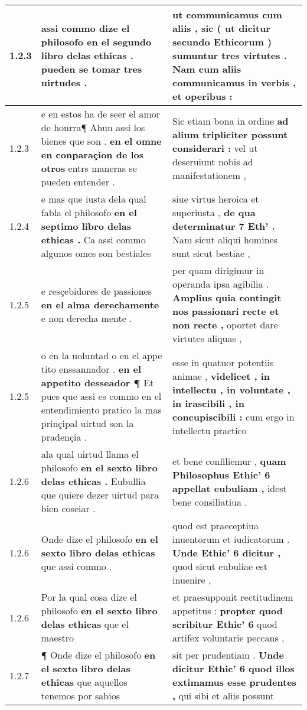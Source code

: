 \begin{tabular}{|p{1cm}|p{6.5cm}|p{6.5cm}|}
1.2.3 & assi commo dize el philosofo \textbf{ en el segundo libro delas ethicas . } pueden se tomar tres uirtudes . & ut communicamus cum aliis , \textbf{ sic ( ut dicitur secundo Ethicorum ) sumuntur tres virtutes . } Nam cum aliis communicamus in verbis , et operibus : \\\hline
1.2.3 & e en estos ha de seer el amor de honrra¶ Ahun assi los bienes que son . \textbf{ en el omne en conparaçion de los otros } entrs maneras se pueden entender . & Sic etiam bona in ordine \textbf{ ad alium tripliciter possunt considerari : } vel ut deseruiunt nobis ad manifestationem , \\\hline
1.2.4 & e mas que iusta dela qual fabla el philosofo \textbf{ en el septimo libro delas ethicas . } Ca assi commo algunos omes son bestiales & siue virtus heroica et superiusta , \textbf{ de qua determinatur 7 Eth’ . } Nam sicut aliqui homines sunt sicut bestiae , \\\hline
1.2.5 & e resçebidores de passiones \textbf{ en el alma derechamente } e non derecha mente . & per quam dirigimur in operanda ipsa agibilia . \textbf{ Amplius quia contingit nos passionari recte et non recte , } oportet dare virtutes aliquas , \\\hline
1.2.5 & o en la uoluntad o en el appe tito enssannador . \textbf{ en el appetito desseador ¶ } Et pues que assi es commo en el entendimiento pratico la mas prinçipal uirtud son la pradençia . & esse in quatuor potentiis animae , \textbf{ videlicet , in intellectu , in voluntate , in irascibili , in concupiscibili : } cum ergo in intellectu practico \\\hline
1.2.6 & ala qual uirtud llama el philosofo \textbf{ en el sexto libro delas ethicas . } Eubullia que quiere dezer uirtud para bien coseiar . & et bene confiliemur , \textbf{ quam Philosophus Ethic’ 6 appellat eubuliam , } idest bene consiliatiua . \\\hline
1.2.6 & Onde dize el philosofo \textbf{ en el sexto libro delas ethicas } que assi commo . & quod est praeceptiua inuentorum et iudicatorum . \textbf{ Unde Ethic’ 6 dicitur , } quod sicut eubuliae est inuenire , \\\hline
1.2.6 & Por la qual cosa dize el philosofo \textbf{ en el sexto libro delas ethicas } que el maestro & et praesupponit rectitudinem appetitus : \textbf{ propter quod scribitur Ethic’ 6 } quod artifex voluntarie peccans , \\\hline
1.2.7 & ¶ Onde dize el philosofo \textbf{ en el sexto libro delas ethicas } que aquellos tenemos por sabios & sit per prudentiam . \textbf{ Unde dicitur Ethic’ 6 quod illos extimamus esse prudentes , } qui sibi et aliis possunt \\\hline

\end{tabular}
